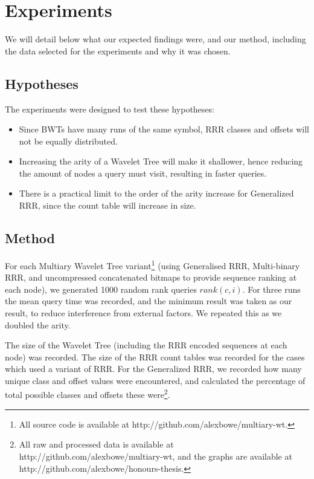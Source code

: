 \section{Experiments}
\label{sec:experiments}

We will detail below what our expected findings were, and our method, including 
the data selected for the experiments and why it was chosen.

\subsection{Hypotheses}
The experiments were designed to test these hypotheses:

\begin{itemize}
    \item 	
			Since BWTs have many runs of the same symbol, RRR classes and 
			offsets will not be equally distributed.

    \item 	
			Increasing the arity of a Wavelet Tree will make it shallower,
		   	hence reducing the amount of nodes a query must visit, resulting
		   	in faster queries.
			
    \item  
			There is a practical limit to the order of the arity increase for 
		   	Generalized RRR, since the count table will increase in size.
\end{itemize}

\subsection{Method}
For each Multiary Wavelet Tree variant\footnote{All source code is available at http://github.com/alexbowe/multiary-wt.} (using Generalised RRR, Multi-binary
RRR, and uncompressed concatenated bitmaps to provide
sequence ranking at each node), we generated 1000 
random rank queries $rank(c, i)$. For three runs the mean query time was 
recorded, and the minimum result was taken as our result, to reduce interference 
from external factors. We repeated this as we doubled the arity.

The size of  the Wavelet Tree (including the RRR encoded sequences at each node) 
was recorded. The size of the RRR count tables was recorded for the cases which 
used a variant of RRR. For the Generalized RRR, we recorded how many unique 
class and offset values were encountered, and calculated the percentage of total 
possible 
classes and offsets these were\footnote{All raw and processed data is 
available at http://github.com/alexbowe/multiary-wt, and the graphs are 
available at http://github.com/alexbowe/honours-thesis.}.

